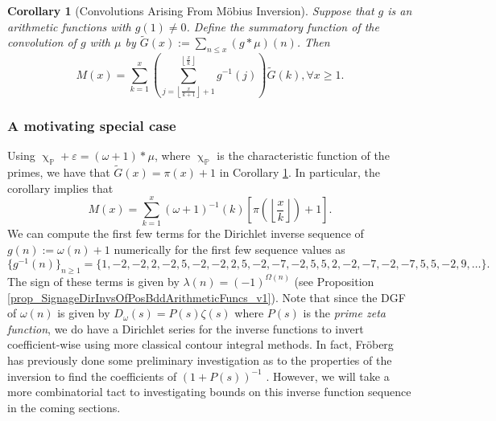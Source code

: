 \documentclass[11pt,reqno,a4letter]{article}
\numberwithin{figure}{section}
\numberwithin{table}{section}
\newcommand{\floor}[1]{\left\lfloor #1 \right\rfloor}
\renewcommand{\chi}{\upchi}
\newcommand{\Floor}[2]{\ensuremath{\left\lfloor \frac{#1}{#2} \right\rfloor}}
\theoremstyle{plain}
\newtheorem{cor}[theorem]{Corollary}
\numberwithin{theorem}{section}
\theoremstyle{definition}
\begin{document}
\begin{cor}[Convolutions Arising From M\"obius Inversion] 
\label{cor_CvlGAstMu} 
Suppose that $g$ is an arithmetic functions with $g(1) \neq 0$. Define the summatory function of 
the convolution of $g$ with $\mu$ by $\widetilde{G}(x) := \sum_{n \leq x} (g \ast \mu)(n)$. 
Then 
\[
M(x) = \sum_{k=1}^{x} \left(\sum_{j=\floor{\frac{x}{k+1}}+1}^{\floor{\frac{x}{k}}} g^{-1}(j)\right) 
     \widetilde{G}(k), \forall x \geq 1. 
\]
\end{cor} 

\subsubsection{A motivating special case} 
\label{example_InvertingARecRelForMx_Intro}
 
Using $\chi_{\mathbb{P}} + \varepsilon = (\omega + 1) \ast \mu$, 
where $\chi_{\mathbb{P}}$ is the characteristic 
function of the primes, we have that $\widetilde{G}(x) = \pi(x) + 1$ in 
Corollary \ref{cor_CvlGAstMu}. 
In particular, the corollary implies that 
\begin{equation} 
\label{eqn_Mx_gInvnPixk_formula} 
M(x) = \sum_{k=1}^{x} (\omega+1)^{-1}(k) \left[\pi\left(\Floor{x}{k}\right) + 1\right]. 
\end{equation} 
We can compute the first few terms for the
Dirichlet inverse sequence of 
$g(n) := \omega(n) + 1$ numerically for the first few sequence values as 
\[
\{g^{-1}(n)\}_{n \geq 1} = \{1, -2, -2, 2, -2, 5, -2, -2, 2, 5, -2, -7, -2, 5, 5, 2, -2, -7, -2, 
     -7, 5, 5, -2, 9, \ldots \}. 
\] 
The sign of these terms is given by $\lambda(n) = (-1)^{\Omega(n)}$ 
(see Proposition \ref{prop_SignageDirInvsOfPosBddArithmeticFuncs_v1}). 
Note that since the DGF of $\omega(n)$ is given by 
$D_{\omega}(s) = P(s) \zeta(s)$ where $P(s)$ is the \emph{prime zeta function}, we do have a 
Dirichlet series for the inverse functions to invert coefficient-wise using more classical 
contour integral methods. 
In fact, Fr\"oberg has previously done some preliminary investigation as to the properties of the 
inversion to find the coefficients of $(1+P(s))^{-1}$ \cite{FROBERG-1968}. 
However, we will take a more combinatorial tact to investigating bounds on this inverse function 
sequence in the coming sections. 
\end{document}
